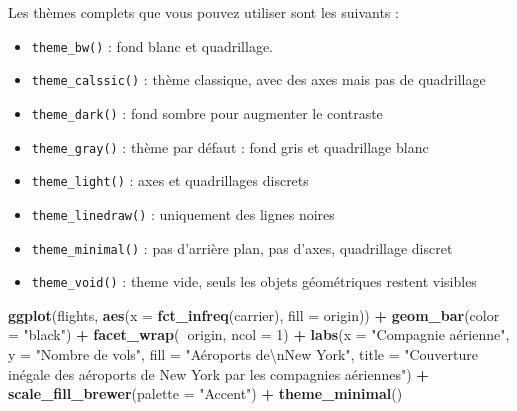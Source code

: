 \documentclass[a4paperpaper,]{article}
\newenvironment{Shaded}{\begin{snugshade}}{\end{snugshade}}
\newcommand{\KeywordTok}[1]{\textcolor[rgb]{0.13,0.29,0.53}{\textbf{#1}}}
\newcommand{\DataTypeTok}[1]{\textcolor[rgb]{0.13,0.29,0.53}{#1}}
\newcommand{\DecValTok}[1]{\textcolor[rgb]{0.00,0.00,0.81}{#1}}
\newcommand{\CharTok}[1]{\textcolor[rgb]{0.31,0.60,0.02}{#1}}
\newcommand{\StringTok}[1]{\textcolor[rgb]{0.31,0.60,0.02}{#1}}
\newcommand{\OperatorTok}[1]{\textcolor[rgb]{0.81,0.36,0.00}{\textbf{#1}}}
\newcommand{\NormalTok}[1]{#1}
\providecommand{\tightlist}{%
  \setlength{\itemsep}{0pt}\setlength{\parskip}{0pt}}
\theoremstyle{definition}
\theoremstyle{definition}
\theoremstyle{definition}
\theoremstyle{remark}
\begin{document}
Les thèmes complets que vous pouvez utiliser sont les suivants :

\begin{itemize}
\tightlist
\item
  \texttt{theme\_bw()} : fond blanc et quadrillage.
\item
  \texttt{theme\_calssic()} : thème classique, avec des axes mais pas de
  quadrillage
\item
  \texttt{theme\_dark()} : fond sombre pour augmenter le contraste
\item
  \texttt{theme\_gray()} : thème par défaut : fond gris et quadrillage
  blanc
\item
  \texttt{theme\_light()} : axes et quadrillages discrets
\item
  \texttt{theme\_linedraw()} : uniquement des lignes noires
\item
  \texttt{theme\_minimal()} : pas d'arrière plan, pas d'axes,
  quadrillage discret
\item
  \texttt{theme\_void()} : theme vide, seuls les objets géométriques
  restent visibles
\end{itemize}

\begin{Shaded}
\begin{Highlighting}[]
\KeywordTok{ggplot}\NormalTok{(flights, }\KeywordTok{aes}\NormalTok{(}\DataTypeTok{x =} \KeywordTok{fct_infreq}\NormalTok{(carrier), }\DataTypeTok{fill =}\NormalTok{ origin)) }\OperatorTok{+}
\StringTok{  }\KeywordTok{geom_bar}\NormalTok{(}\DataTypeTok{color =} \StringTok{"black"}\NormalTok{) }\OperatorTok{+}
\StringTok{  }\KeywordTok{facet_wrap}\NormalTok{(}\OperatorTok{~}\NormalTok{origin, }\DataTypeTok{ncol =} \DecValTok{1}\NormalTok{) }\OperatorTok{+}
\StringTok{  }\KeywordTok{labs}\NormalTok{(}\DataTypeTok{x =} \StringTok{"Compagnie aérienne"}\NormalTok{,}
       \DataTypeTok{y =} \StringTok{"Nombre de vols"}\NormalTok{,}
       \DataTypeTok{fill =} \StringTok{"Aéroports de}\CharTok{\textbackslash{}n}\StringTok{New York"}\NormalTok{,}
       \DataTypeTok{title =} \StringTok{"Couverture inégale des aéroports de New York par les compagnies aériennes"}\NormalTok{) }\OperatorTok{+}
\StringTok{  }\KeywordTok{scale_fill_brewer}\NormalTok{(}\DataTypeTok{palette =} \StringTok{"Accent"}\NormalTok{) }\OperatorTok{+}
\StringTok{  }\KeywordTok{theme_minimal}\NormalTok{()}
\end{Highlighting}
\end{Shaded}
\end{document}

